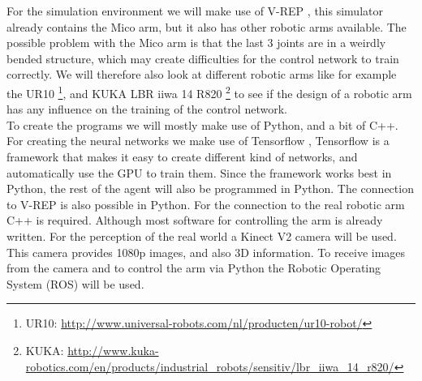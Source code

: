 For the simulation environment we will make use of V-REP \cite{vrep}, this simulator already contains the Mico arm, but it also has other robotic arms available. The possible problem with the Mico arm is that the last 3 joints
are in a weirdly bended structure, which may create difficulties for the control network to train correctly. We will therefore also look at different robotic arms like for example the UR10 \footnote{UR10: \url{http://www.universal-robots.com/nl/producten/ur10-robot/}}, and 
KUKA LBR iiwa 14 R820 \footnote{KUKA: \url{http://www.kuka-robotics.com/en/products/industrial_robots/sensitiv/lbr_iiwa_14_r820/} } to see if the design of a robotic arm has any influence on the training of the control network. \\
To create the programs we will mostly make use of Python, and a bit of C++. For creating the neural networks we make use of Tensorflow \cite{tensorflow2015-whitepaper}, Tensorflow is a framework that makes it easy to create different kind of 
networks, and automatically use the GPU to train them. Since the framework works best in Python, the rest of the agent will also be programmed in Python. The connection to V-REP is also possible 
in Python. For the connection to the real robotic arm C++ is required. Although most software for controlling the arm is already written. For the perception of the real world a Kinect V2 camera will be used. This camera
provides 1080p images, and also 3D information. To receive images from the camera and to control the arm via Python the Robotic Operating System (ROS) \cite{ros} will be used. 






